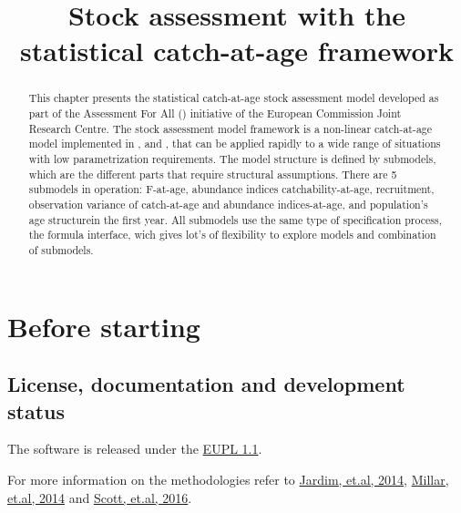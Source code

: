 \documentclass[a4paper,english,11pt]{article}
\begin{document}
\title{Stock assessment with the \aFa statistical catch-at-age framework}



\maketitle

\begin{abstract}
This chapter presents the statistical catch-at-age stock assessment model developed as part of the Assessment For All (\aFa) initiative of the European Commission Joint Research Centre. The stock assessment model framework is a non-linear catch-at-age model implemented in \href{http://www.r-project.org/}{\R}, \href{http://www.flr-project.org/}{\FLR} and \href{http://www.admb-project.org/}{\ADMB}, that can be applied rapidly to a wide range of situations with low parametrization requirements. The model structure is defined by submodels, which are the different parts that require structural assumptions. There are 5 submodels in operation: F-at-age, abundance indices catchability-at-age, recruitment, observation variance of catch-at-age and abundance indices-at-age, and population's age structurein the first year. All submodels use the same type of specification process, the \R formula interface, wich gives lot's of flexibility to explore models and combination of submodels.
\end{abstract}

\newpage
\tableofcontents
\newpage



\section{Before starting}

\subsection{License, documentation and development status}

The software is released under the \href{https://joinup.ec.europa.eu/community/eupl/home}{EUPL 1.1}.

For more information on the \aFa methodologies refer to \href{http://icesjms.oxfordjournals.org/content/early/2014/04/03/icesjms.fsu050.abstract}{Jardim, et.al, 2014}, \href{http://icesjms.oxfordjournals.org/content/early/2014/03/31/icesjms.fsu043.abstract}{Millar, et.al, 2014} and \href{http://journals.plos.org/plosone/article?id=10.1371/journal.pone.0154922}{Scott, et.al, 2016}.
\end{document}
